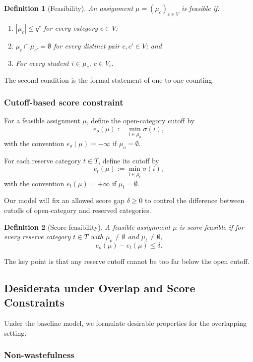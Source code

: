 \documentclass[12pt]{article}
\newtheorem{definition}{Definition}
\newcommand{\1}{\mathbf{1}}
\begin{document}
\begin{definition}[Feasibility]
An assignment $\mu=(\mu_c)_{c\in V}$ is feasible if:
\begin{enumerate}
\item $|\mu_c|\le q^c$ for every category $c\in V$;
\item $\mu_c\cap \mu_{c'}=\emptyset$ for every distinct pair $c,c'\in V$; and
\item For every student $i\in \mu_c$, $c\in V_i$.
\end{enumerate}
\end{definition}

The second condition is the formal statement of one-to-one counting.

\subsubsection{Cutoff-based score constraint}

For a feasible assignment $\mu$, define the open-category cutoff by
\[
e_o(\mu):=\min_{i\in\mu_o}\sigma(i),
\]
with the convention $e_o(\mu)=-\infty$ if $\mu_o=\emptyset$.

For each reserve category $t\in T$, define its cutoff by
\[
e_t(\mu):=\min_{i\in\mu_t}\sigma(i),
\]
with the convention $e_t(\mu)=+\infty$ if $\mu_t=\emptyset$.

Our model will fix an allowed score gap $\delta\ge 0$ to control the difference between cutoffs of open-category and reserved categories.

\begin{definition}[Score-feasibility]
A feasible assignment $\mu$ is score-feasible if for every reserve category $t\in T$ with $\mu_o\neq\emptyset$ and $\mu_t\neq\emptyset$,
\[
e_o(\mu)-e_t(\mu)\le \delta.
\]
\end{definition}

The key point is that any reserve cutoff cannot be too far below the open cutoff.

\subsection{Desiderata under Overlap and Score Constraints}

Under the baseline model, we formulate desirable properties for the overlapping setting.

\subsubsection{Non-wastefulness}
\end{document}
